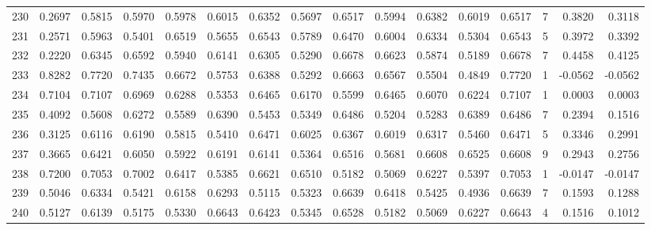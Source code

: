 \begin{tabular}{lrrrrrrrrrrrrrrr}
230 &      0.2697 &  0.5815 &  0.5970 &  0.5978 &  0.6015 &  0.6352 &  0.5697 &  0.6517 &  0.5994 &  0.6382 &   0.6019 &     0.6517 &      7 &                    0.3820 &                     0.3118 \\
231 &      0.2571 &  0.5963 &  0.5401 &  0.6519 &  0.5655 &  0.6543 &  0.5789 &  0.6470 &  0.6004 &  0.6334 &   0.5304 &     0.6543 &      5 &                    0.3972 &                     0.3392 \\
232 &      0.2220 &  0.6345 &  0.6592 &  0.5940 &  0.6141 &  0.6305 &  0.5290 &  0.6678 &  0.6623 &  0.5874 &   0.5189 &     0.6678 &      7 &                    0.4458 &                     0.4125 \\
233 &      0.8282 &  0.7720 &  0.7435 &  0.6672 &  0.5753 &  0.6388 &  0.5292 &  0.6663 &  0.6567 &  0.5504 &   0.4849 &     0.7720 &      1 &                   -0.0562 &                    -0.0562 \\
234 &      0.7104 &  0.7107 &  0.6969 &  0.6288 &  0.5353 &  0.6465 &  0.6170 &  0.5599 &  0.6465 &  0.6070 &   0.6224 &     0.7107 &      1 &                    0.0003 &                     0.0003 \\
235 &      0.4092 &  0.5608 &  0.6272 &  0.5589 &  0.6390 &  0.5453 &  0.5349 &  0.6486 &  0.5204 &  0.5283 &   0.6389 &     0.6486 &      7 &                    0.2394 &                     0.1516 \\
236 &      0.3125 &  0.6116 &  0.6190 &  0.5815 &  0.5410 &  0.6471 &  0.6025 &  0.6367 &  0.6019 &  0.6317 &   0.5460 &     0.6471 &      5 &                    0.3346 &                     0.2991 \\
237 &      0.3665 &  0.6421 &  0.6050 &  0.5922 &  0.6191 &  0.6141 &  0.5364 &  0.6516 &  0.5681 &  0.6608 &   0.6525 &     0.6608 &      9 &                    0.2943 &                     0.2756 \\
238 &      0.7200 &  0.7053 &  0.7002 &  0.6417 &  0.5385 &  0.6621 &  0.6510 &  0.5182 &  0.5069 &  0.6227 &   0.5397 &     0.7053 &      1 &                   -0.0147 &                    -0.0147 \\
239 &      0.5046 &  0.6334 &  0.5421 &  0.6158 &  0.6293 &  0.5115 &  0.5323 &  0.6639 &  0.6418 &  0.5425 &   0.4936 &     0.6639 &      7 &                    0.1593 &                     0.1288 \\
240 &      0.5127 &  0.6139 &  0.5175 &  0.5330 &  0.6643 &  0.6423 &  0.5345 &  0.6528 &  0.5182 &  0.5069 &   0.6227 &     0.6643 &      4 &                    0.1516 &                     0.1012 \\

\end{tabular}
